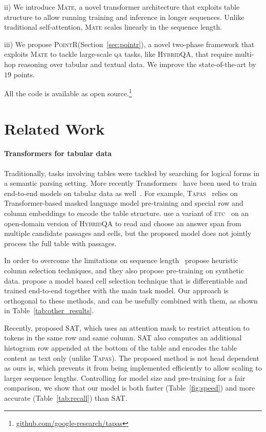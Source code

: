 \documentclass[11pt]{article}
\newcommand{\abr}[1]{\textsc{#1}}
\newcommand{\qa}[0]{\abr{qa}}
\newcommand\hqa{\textsc{HybridQA}\xspace}
\newcommand{\pointr}{\textsc{PointR}\xspace}
\newcommand{\etc}{\textsc{etc}\xspace}
\newcommand{\tapas}{\textsc{Tapas}\xspace}
\newcommand{\sat}{\textsc{SAT}\xspace}
\newcommand{\model}{\textsc{Mate}\xspace}
\begin{document}
ii) We introduce \model, a novel transformer architecture that exploits table structure to allow running training and inference in longer sequences. Unlike traditional self-attention, \model scales linearly in the sequence length.

iii) We propose \pointr (Section~\ref{sec:pointr}), a novel two-phase framework that exploits \model to tackle large-scale \qa{} tasks, like \hqa, that require multi-hop reasoning over tabular and textual data. We improve the state-of-the-art by $19$ points.

All the code is available as open source.\footnote{\href{https://github.com/google-research/tapas}{github.com/google-research/tapas}}
 \section{Related Work}
\label{sec:related}


\paragraph{Transformers for tabular data}
Traditionally, tasks involving tables were tackled  by searching for logical forms
in a semantic parsing setting. More recently Transformers~\cite{vaswani17} have been used
to train end-to-end models on tabular data as well~\cite{Chen2020TabFact}.
For example, \tapas~\cite{herzig-etal-2020-tapas} relies on Transformer-based masked language model pre-training and special row and column embeddings
to encode the table structure. \citet{chen2021open} 
use a variant of \etc ~\cite{ainslie-etal-2020-etc} 
on an open-domain version of \hqa
to read and choose an answer span from multiple candidate passages and cells, but the proposed model does not jointly process the full table with passages.

In order to overcome the limitations on sequence length~\citet{eisenschlos-etal-2020-understanding}
propose heuristic column selection techniques, and they also propose pre-training on synthetic data. 
\citet{krichene-etal-2021-dot} propose a model based cell selection technique that is differentiable and trained end-to-end together with the main task model.
Our approach is
orthogonal to these methods, and can be usefully combined with them, as shown in Table~\ref{tab:other_results}.

Recently, \citet{zhang-etal-2020-table}  proposed \sat, which uses an attention mask
to restrict attention to tokens in the same
row and same column. \sat also computes an additional histogram row appended at the bottom of the table and encodes the table content as text only (unlike \tapas). The proposed method is not head dependent
as ours is, which prevents it from being implemented efficiently to allow scaling to larger
sequence lengths. Controlling for model size and pre-training for a fair comparison, we show that our model is both faster (Table~\ref{fig:speed}) and more accurate (Table~\ref{tab:recall}) than \sat.
\end{document}
